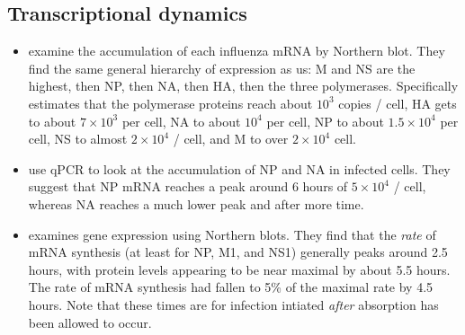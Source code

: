 \documentclass[9pt,lineno]{elife}
\begin{document}
\subsection{Transcriptional dynamics}

\begin{itemize}

\item \citet{hatada1989control} examine the accumulation of each influenza mRNA by Northern blot.
They find the same general hierarchy of expression as us: M and NS are the highest, then NP, then NA, then HA, then the three polymerases.
Specifically estimates that the polymerase proteins reach about $10^3$ copies / cell, HA gets to about $7 \times 10^3$ per cell, NA to about $10^4$ per cell, NP to about $1.5 \times 10^4$ per cell, NS to almost $2 \times 10^4$ / cell, and M to over $2 \times 10^4$ cell.

\item \citet{kawakami2011strand} use qPCR to look at the accumulation of NP and NA in infected cells.
They suggest that NP mRNA reaches a peak around 6 hours of $5 \times 10^4$ / cell, whereas NA reaches a much lower peak and after more time.

\item \citet{shapiro1987influenza} examines gene expression using Northern blots.
They find that the \emph{rate} of mRNA synthesis (at least for NP, M1, and NS1) generally peaks around 2.5 hours, with protein levels appearing to be near maximal by about 5.5 hours.
The rate of mRNA synthesis had fallen to 5\% of the maximal rate by 4.5 hours. 
Note that these times are for infection intiated \emph{after} absorption has been allowed to occur.

\end{itemize}



\nocite{*} %

\end{document}
